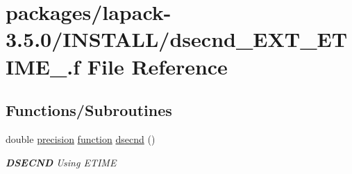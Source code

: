 \hypertarget{dsecnd__EXT__ETIME___8f}{}\section{packages/lapack-\/3.5.0/\+I\+N\+S\+T\+A\+L\+L/dsecnd\+\_\+\+E\+X\+T\+\_\+\+E\+T\+I\+M\+E\+\_\+.f File Reference}
\label{dsecnd__EXT__ETIME___8f}
\subsection*{Functions/\+Subroutines}
\begin{DoxyCompactItemize}
\item 
double \hyperlink{numinquire_8h_a2c8e616467665d0b2814d4c1589ba74e}{precision} \hyperlink{afunc_8m_a7b5e596df91eadea6c537c0825e894a7}{function} \hyperlink{group__auxOTHERauxiliary_gafe21a6b76340ac0afd7f0f84326e7918}{dsecnd} ()
\begin{DoxyCompactList}\small\item\em {\bfseries D\+S\+E\+C\+N\+D} Using E\+T\+I\+M\+E \end{DoxyCompactList}\end{DoxyCompactItemize}
